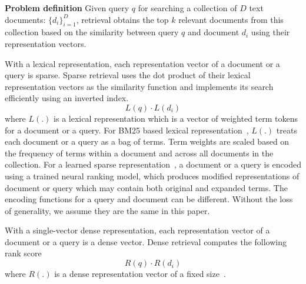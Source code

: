 \textbf{Problem definition}
Given query $q$ for searching a collection of $D$ text documents:   $ \{d_i\}^D_{i=1}$, 
retrieval  obtains the top $k$ relevant documents from this collection based on
the similarity between query $q$ and document  $d_i$ using  their
representation vectors.

With a lexical representation, each  representation vector of a document or a query is sparse.
Sparse retrieval uses  the dot product of their lexical representation vectors as the similarity function
and implements its search efficiently using an inverted index. 
\begin{equation}
\label{eq:sparseretrieval}
L(q) \cdot  L(d_i)
\end{equation}
where $L(.)$ is a lexical representation   which is a vector of weighted term tokens for a document or a query.
For BM25 based lexical representation~\cite{Robertson2009BM25}, 
$L(.)$ treats each document or a query as a bag of terms.
Term weights are scaled based on the frequency of terms within a document and across all documents in the collection.
For a learned sparse representation~\cite{Dai2020deepct, Mallia2021deepimpact, Lin2021unicoil,2021NAACL-Gao-COIL}, 
a document or a query is encoded using  a trained neural ranking model, which
produces modified representations of document or query which may contain both original and expanded terms.
The encoding functions for a query and document can be different. Without the loss of generality, we assume they are the same in this paper.

With a single-vector dense  representation, each  representation vector of a document or a query is a dense vector. 
Dense retrieval computes the following rank score
\begin{equation}
\label{eq:denseretrieval}
R(q) \cdot  R(d_i)
\end{equation}
where $R(.)$ is a dense representation vector  of a fixed size~\cite{Karpukhin2020DPR}.


